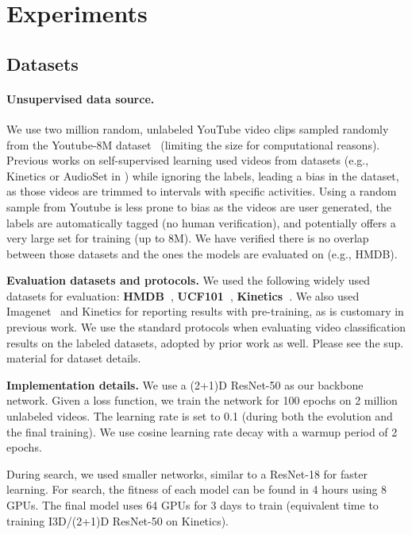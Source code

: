 \documentclass[10pt,twocolumn,letterpaper]{article}
\begin{document}
\section{Experiments}




\subsection{Datasets} 

\paragraph{Unsupervised data source.} We use two million random, unlabeled YouTube video clips sampled randomly from the Youtube-8M dataset~\cite{abu2016youtube} (limiting the size for computational reasons). Previous works on self-supervised learning used videos from datasets (e.g., Kinetics or AudioSet in \cite{korbar2018cooperative}) while ignoring the labels, leading a bias in the dataset, as those videos are trimmed to intervals with specific activities. Using a random sample from Youtube is less prone to bias as the videos are user generated, the labels are automatically tagged (no human verification), and potentially offers a very large set for training (up to 8M). 
We have verified there is no overlap between those datasets and the ones the models are evaluated on (e.g., HMDB).








\textbf{Evaluation datasets and protocols.}
We used the following widely used datasets for evaluation: 
\textbf{HMDB~\cite{kuehne2011hmdb}},
\textbf{UCF101~\cite{UCF101}},
\textbf{Kinetics~\cite{kay2017kinetics}}.
We also used Imagenet~\cite{imagenet_cvpr09} and Kinetics for reporting results with pre-training, as is customary in previous work.
We use the standard protocols when evaluating video classification results on the labeled datasets, adopted by prior work as well. Please see the sup. material for dataset details.



\textbf{Implementation details.} We use a (2+1)D ResNet-50 as our backbone network. Given a loss function, we train the network for 100 epochs on 2 million unlabeled videos. The learning rate is set to 0.1 (during both the evolution and the final training). We use cosine learning rate decay with a warmup period of 2 epochs.

During search, we used smaller networks, similar to a ResNet-18 for faster learning. For search, the fitness of each model can be found in 4 hours using 8 GPUs. The final model uses 64 GPUs for 3 days to train (equivalent time to training I3D/(2+1)D ResNet-50 on Kinetics). 
\end{document}
